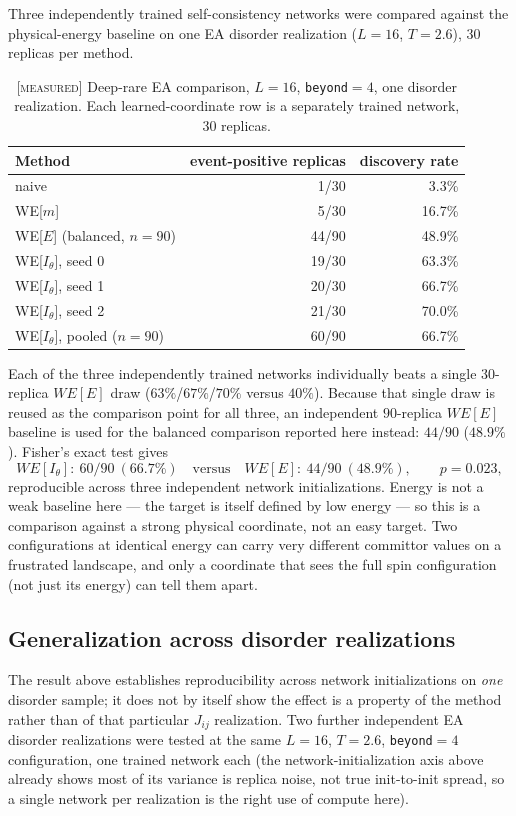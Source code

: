 \documentclass[11pt,a4paper]{article}
\newcommand{\MEAS}{\textcolor{blue!60!black}{\footnotesize[\textsc{measured}]}}
\begin{document}
Three independently trained self-consistency networks were compared against the physical-energy
baseline on one EA disorder realization ($L=16$, $T=2.6$), $30$ replicas per method.

\begin{table}[H]\centering\small
\caption{\MEAS{} Deep-rare EA comparison, $L=16$, \texttt{beyond}$=4$, one disorder realization.
Each learned-coordinate row is a separately trained network, 30 replicas.}
\label{tab:deep}
\begin{tabular}{lrr}\toprule
Method & event-positive replicas & discovery rate\\\midrule
naive & 1/30 & 3.3\%\\
WE[$m$] & 5/30 & 16.7\%\\
WE[$E$] (balanced, $n=90$) & 44/90 & 48.9\%\\
WE[$I_\theta$], seed 0 & 19/30 & 63.3\%\\
WE[$I_\theta$], seed 1 & 20/30 & 66.7\%\\
WE[$I_\theta$], seed 2 & 21/30 & 70.0\%\\
WE[$I_\theta$], pooled ($n=90$) & 60/90 & 66.7\%\\
\bottomrule\end{tabular}
\end{table}

Each of the three independently trained networks individually beats a single $30$-replica
$WE[E]$ draw ($63\%$/$67\%$/$70\%$ versus $40\%$). Because that single draw is reused as the
comparison point for all three, an independent $90$-replica $WE[E]$ baseline is used for the
balanced comparison reported here instead: $44/90$ ($48.9\%$). Fisher's exact test gives
\begin{equation}
WE[I_\theta]:\ 60/90\ (66.7\%)\quad\text{versus}\quad WE[E]:\ 44/90\ (48.9\%),\qquad p=0.023,
\label{eq:withinp}
\end{equation}
reproducible across three independent network initializations. Energy is not a weak baseline
here --- the target is itself defined by low energy --- so this is a comparison against a strong
physical coordinate, not an easy target. Two configurations at identical energy can carry very
different committor values on a frustrated landscape, and only a coordinate that sees the full
spin configuration (not just its energy) can tell them apart.

\subsection{Generalization across disorder realizations}\label{sec:disordergen}
The result above establishes reproducibility across network initializations on \emph{one}
disorder sample; it does not by itself show the effect is a property of the method rather than of
that particular $J_{ij}$ realization. Two further independent EA disorder realizations were
tested at the same $L=16$, $T=2.6$, \texttt{beyond}$=4$ configuration, one trained network each
(the network-initialization axis above already shows most of its variance is replica noise, not
true init-to-init spread, so a single network per realization is the right use of compute here).
\end{document}
